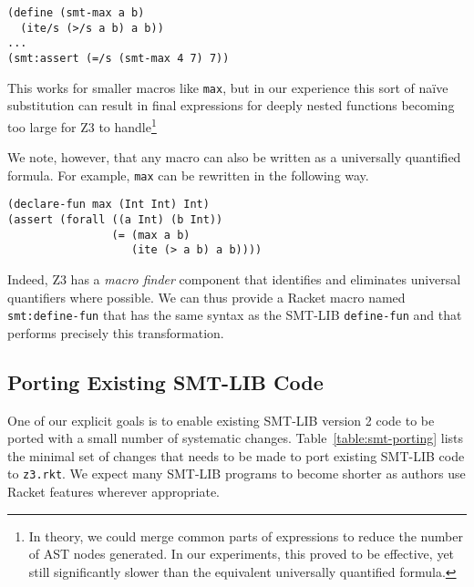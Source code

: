 \begin{verbatim}
(define (smt-max a b)
  (ite/s (>/s a b) a b))
...
(smt:assert (=/s (smt-max 4 7) 7))
\end{verbatim}

This works for smaller macros like \texttt{max}, but in our experience this
sort of na\"{i}ve substitution can result in final expressions for deeply
nested functions becoming too large for Z3 to handle\footnote{In theory, we
could merge common parts of expressions to reduce the number of AST nodes
generated. In our experiments, this proved to be effective, yet still
significantly slower than the equivalent universally quantified formula.}

We note, however, that any macro can also be written as a universally
quantified formula. For example, \texttt{max} can be rewritten in the
following way.

\begin{verbatim}
(declare-fun max (Int Int) Int)
(assert (forall ((a Int) (b Int))
                (= (max a b)
                   (ite (> a b) a b))))
\end{verbatim}

Indeed, Z3 has a \textit{macro finder} component that identifies and
eliminates universal quantifiers where possible. We can thus provide a Racket
macro named \texttt{smt:define-fun} that has the same syntax as the SMT-LIB
\texttt {define-fun} and that performs precisely this transformation.

\subsection{Porting Existing SMT-LIB Code}
\label{sec:porting-smt-lib}

One of our explicit goals is to enable existing SMT-LIB version 2 code to be
ported with a small number of systematic changes. Table~\ref{table:smt-porting}
lists the minimal set of changes that needs to be made to port
existing SMT-LIB code to \texttt{z3.rkt}. We expect many SMT-LIB programs
to become shorter as authors use Racket features wherever appropriate.

